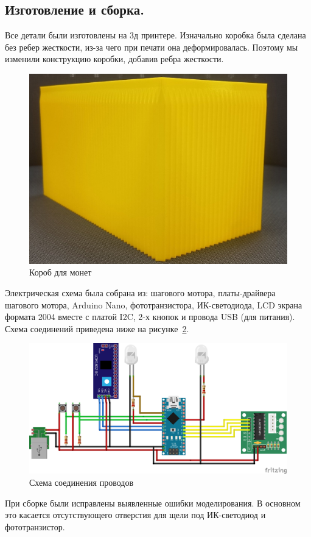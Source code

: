 \subsection{Изготовление и сборка.}

Все детали были изготовлены на 3д принтере. Изначально коробка была сделана без ребер жесткости, из-за чего при печати она деформировалась. Поэтому мы изменили конструкцию коробки, добавив ребра жесткости. 
\par\medskip

\begin{figure}[H]
	\centering
	\includegraphics[width=12cm]{pics/korob.jpg}
	\caption{Короб для монет}
	\label{ris:korob_done}
\end{figure}

Электрическая схема была собрана из: шагового мотора, платы-драйвера шагового мотора, Arduino Nano, фототранзистора, ИК-светодиода, LCD экрана формата 2004 вместе с платой I2C, 2-х кнопок и провода USB (для питания). Схема соединений приведена ниже на рисунке~\ref{ris:scheme_electric}.

\begin{figure}[H]
	\centering
	\includegraphics[width=12cm]{pics/scheme_png.png}
	\caption{Схема соединения проводов}
	\label{ris:scheme_electric}
\end{figure}

При сборке были исправлены выявленные ошибки моделирования. В основном это касается отсутствующего отверстия для щели под ИК-светодиод и фототранзистор.
\par\medskip